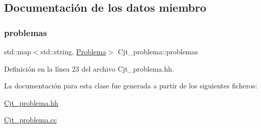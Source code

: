\subsection{Documentación de los datos miembro}
\mbox{\label{class_cjt__problema_a2d471986320805c5b27f8d14d486fca8}} 
\subsubsection{\texorpdfstring{problemas}{problemas}}
{\footnotesize\ttfamily std\+::map$<$std\+::string, \mbox{\hyperlink{class_problema}{Problema}}$>$ Cjt\+\_\+problema\+::problemas\hspace{0.3cm}{\ttfamily [private]}}



Definición en la línea 23 del archivo Cjt\+\_\+problema.\+hh.



La documentación para esta clase fue generada a partir de los siguientes ficheros\+:\begin{DoxyCompactItemize}
\item 
\mbox{\hyperlink{_cjt__problema_8hh}{Cjt\+\_\+problema.\+hh}}\item 
\mbox{\hyperlink{_cjt__problema_8cc}{Cjt\+\_\+problema.\+cc}}\end{DoxyCompactItemize}
